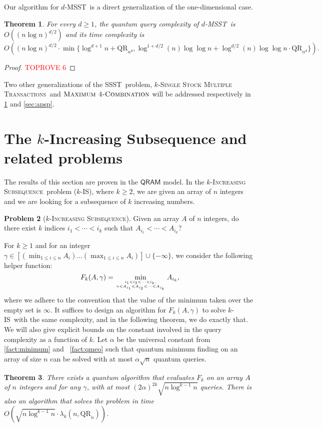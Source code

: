 \documentclass[12pt]{article}
\newcommand{\qr}{\mathrm{QR}}
\newcommand{\MaxFourCf}{\textsc{Maximum 4-Combination}}
\newcommand{\SSST}{\textsc{SSST}}
\newcommand{\ISf}{\textsc{Increasing Subsequence}}
\newcommand{\IS}{\textsc{IS}}
\newcommand{\SSMTf}{\textsc{Single Stock Multiple Transactions}}
\newcommand{\MSST}{\textsc{MSST}}
\newtheorem{theorem}{Theorem}
\theoremstyle{definition}
\newtheorem{problem}[theorem]{Problem}
\begin{document}
Our algorithm for $d$-\MSST \ is a direct generalization of the one-dimensional case.
\begin{theorem}
\label{thm:ssmt}
For every $d \geq 1$, the quantum query complexity of $d$-\MSST \ is $O( (n \log n)^{d/2})$ and its time complexity is
$$
O \left ((n \log n)^{d/2} \cdot \min \{\log^{d+1} n + \qr_{n^d} , \log^{1 + d/2} (n) \log \log n + \log^{d/2} (n) \log \log n \cdot \qr_{n^d} \} \right).
$$
\end{theorem}
\begin{proof}\textcolor{red}{TOPROVE 6}\end{proof}

Two other generalizations of the \SSST \ problem, $k$-\SSMTf \ and $\MaxFourCf$ will be addressed respectively in \cref{sec:is} and \cref{sec:apsp}.



\section{The $k$-Increasing Subsequence and related problems}
\label{sec:is}
The results of this section are proven in the $\mathsf{QRAM}$ model.
In the $k$-\ISf \ problem ($k$-\IS), where $k \geq 2$, we are given an array of $n$ integers and we are looking for a subsequence of $k$ increasing numbers.
\begin{problem}[$k$-\ISf]
Given an array $A$ of $n$ integers, do there exist $k$ indices $i_1 < \cdots < i_k$ such that $A_{i_1} < \cdots < 
A_{i_k}$?
\end{problem} 
For $k \geq 1$ and for an integer $\gamma \in [(\min_{1 \leq i \leq n} A_i) \ldots (\max_{1 \leq i \leq n}  A_i)] \cup \{-\infty\}$, we consider the following helper function:
\[
F_k(A,\gamma) = \min_{i_1 < i_2 < \cdots < i_k, \atop \gamma < A_{i_1} < A_{i_2} < \cdots < A_{i_k}} A_{i_k},
\]
where we adhere to the convention that the value of the minimum taken over the empty set is $\infty$.
It suffices to design an algorithm for $F_k(A, \gamma)$ to solve $k$-\IS \ with the same complexity, and in the following theorem, we do exactly that. 
We will also give explicit bounds on the constant involved in the query complexity as a 
function of $k$.
Let $\alpha$ be the universal 
constant from \cref{fact:minimum} and ~\cref{fact:qmeo} such that quantum minimum finding on an array of size $n$ can be solved with at most $\alpha \sqrt{n}$ quantum queries.  

\begin{theorem}
\label{thm:k-is}
There exists a quantum algorithm that evaluates $F_k$ on an array $A$ of $n$ integers and for any $\gamma$, with at most 
$(2\alpha)^{2k} \sqrt{n \log^{k-1} n}$ queries. 
There is also an algorithm that solves the problem in time $O(\sqrt{n \log^{k-1} n} \cdot  \lambda_k(n,\qr_n))$.
\end{theorem}
\end{document}
